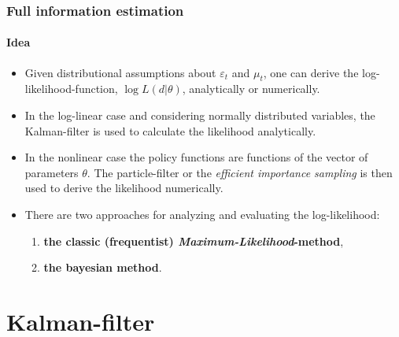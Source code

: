 \documentclass[handout]{beamer}  %
\begin{document}
\begin{frame}\frametitle{Full information estimation}\framesubtitle{Idea}
  \begin{itemize}
    \item Given distributional assumptions about $\varepsilon_t$ and $\mu_t$, one can derive the log-likelihood-function, $\log{L(d|\theta)}$, analytically or numerically.
    \item In the log-linear case and considering normally distributed variables, the Kalman-filter is used to calculate the likelihood analytically.
    \item In the nonlinear case the policy functions are functions of the vector of parameters $\theta$. The particle-filter or the \emph{efficient importance sampling} is then used to derive the likelihood numerically.
    \item There are two approaches for analyzing and evaluating the log-likelihood:
    \begin{enumerate}
      \item \textbf{the classic (frequentist) \emph{Maximum-Likelihood}-method},
      \item \textbf{the bayesian method}.
    \end{enumerate}
  \end{itemize}
\end{frame}

\section{Kalman-filter}
\end{document}
